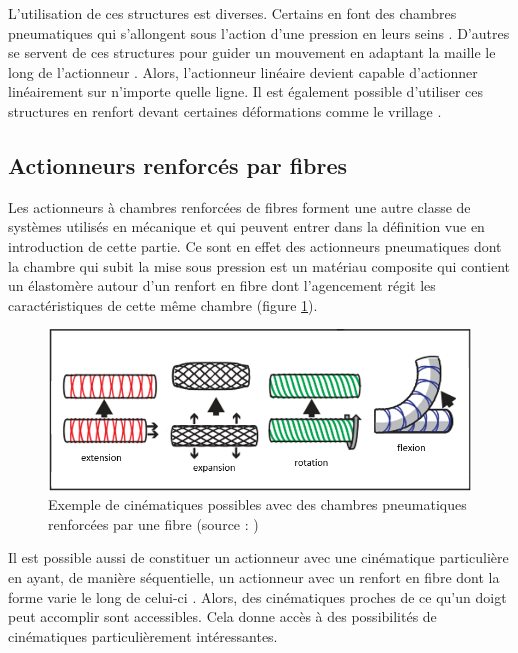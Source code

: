 \documentclass[10pt, a4paper]{article}
\begin{document}
    L'utilisation de ces structures est diverses. Certains en font des chambres pneumatiques qui s'allongent sous l'action d'une pression en leurs seins \cite{Pfeil2018}. D'autres se servent de ces structures pour guider un mouvement en adaptant la maille le long de l'actionneur \cite{Sedal2018}. Alors, l'actionneur linéaire devient capable d'actionner linéairement sur n'importe quelle ligne. Il est également possible d'utiliser ces structures en renfort devant certaines déformations comme le vrillage \cite{Karnessis2013}.
    
    \subsection{Actionneurs renforcés par fibres}
    
    Les actionneurs à chambres renforcées de fibres forment une autre classe de systèmes utilisés en mécanique et qui peuvent entrer dans la définition vue en introduction de cette partie. Ce sont en effet des actionneurs pneumatiques dont la chambre qui subit la mise sous pression est un matériau composite qui contient un élastomère autour d'un renfort en fibre dont l'agencement régit les caractéristiques de cette même chambre \cite{Sedal2018a} \cite{Connolly2017} \cite{Takashima2010} \cite{Polygerinos2015} \cite{Lambert2016} \cite{Chou1996} \cite{Science} \cite{Zhang2012} \cite{Doumit2009} \cite{Daerden2002} \cite{Ranzani2016} (figure \ref{fig:chamberFiberEx}). 

\begin{figure}[ht!]
\centering
\includegraphics[scale=0.8]{ImageIntro/chamberFiber.png}
\caption{ Exemple de cinématiques possibles avec des chambres pneumatiques renforcées par une fibre (source : \cite{Connolly2017})}
\label{fig:chamberFiberEx}
\end{figure}

    Il est possible aussi de constituer un actionneur avec une cinématique particulière en ayant, de manière séquentielle, un actionneur avec un renfort en fibre dont la forme varie le long de celui-ci \cite{Connolly2017}. Alors, des cinématiques proches de ce qu'un doigt peut accomplir sont accessibles. Cela donne accès à des possibilités de cinématiques particulièrement intéressantes.
    
\end{document}
